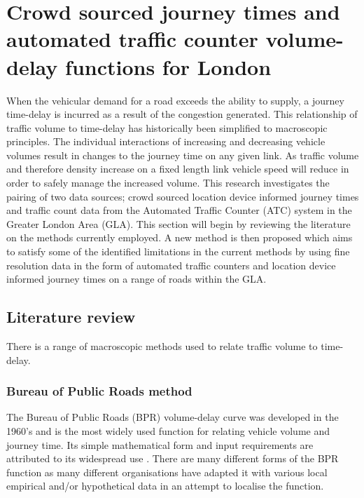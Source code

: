 \documentclass{CUP-JNL-DCE}
\begin{document}
\section{Crowd sourced journey times and automated traffic counter volume-delay functions for London}\label{v_d_ftns}

When the vehicular demand for a road exceeds the ability to supply, a journey time-delay is incurred as a result of the congestion generated. This relationship of traffic volume to time-delay has historically been simplified to macroscopic principles. The individual interactions of increasing and decreasing vehicle volumes result in changes to the journey time on any given link. As traffic volume and therefore density increase on a fixed length link vehicle speed will reduce in order to safely manage the increased volume. This research investigates the pairing of two data sources; crowd sourced location device informed journey times and traffic count data from the Automated Traffic Counter (ATC) system in the Greater London Area (GLA). This section will begin by reviewing the literature on the methods currently employed. A new method is then proposed which aims to satisfy some of the identified limitations in the current methods by using fine resolution data in the form of automated traffic counters and location device informed journey times on a range of roads within the GLA. 

\subsection{Literature review}

There is a range of macroscopic methods used to relate traffic volume to time-delay.

\subsubsection{Bureau of Public Roads method}

The Bureau of Public Roads (BPR) volume-delay curve was developed in the 1960's and is the most widely used function for relating vehicle volume and journey time. Its simple mathematical form and input requirements are attributed to its widespread use \citep{skabardonis1997improved}. There are many different forms of the BPR function as many different organisations have adapted it with various local empirical and/or hypothetical data \citep{mtoi2014calibration} in an attempt to localise the function.
\end{document}
